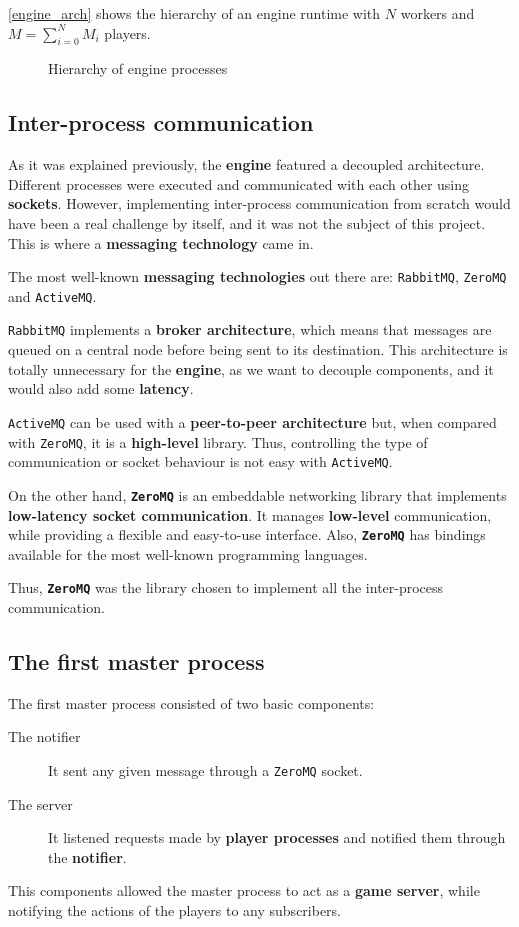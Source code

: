 \documentclass[a4paper,11pt,titlepage,abstract,numbers=noenddot,automark,mnsy,intlimits,rgb,dvipsnames]{report}
\begin{document}
\autoref{engine_arch} shows the hierarchy of an engine runtime with $N$ workers and $M = \sum_{i=0}^{N} M_i$ players.
\begin{figure}[H]
\begin{center}
\noindent\resizebox{\textwidth}{!}{

}
\end{center}
\caption{Hierarchy of engine processes}
\label{engine_arch}
\end{figure}
\subsection{Inter-process communication}
As it was explained previously, the \textbf{engine} featured a decoupled architecture. Different processes were
executed and communicated with each other using \textbf{sockets}. However, implementing inter-process communication from
scratch would have been a real challenge by itself, and it was not the subject of this project. This is where a
\textbf{messaging technology} came in.

The most well-known \textbf{messaging technologies} out there are: \texttt{RabbitMQ}, \texttt{ZeroMQ} and \texttt{ActiveMQ}.

\texttt{RabbitMQ} implements
a \textbf{broker architecture}, which means that messages are queued on a central node before being sent to its destination.
This architecture is totally unnecessary for the \textbf{engine}, as we want to decouple components, and it would also add
some \textbf{latency}.

\texttt{ActiveMQ} can be used with a \textbf{peer-to-peer architecture} but, when compared with \texttt{ZeroMQ}, it is a
\textbf{high-level} library. Thus, controlling the type of communication or socket behaviour is not easy with \texttt{ActiveMQ}.

On the other hand, \textbf{\texttt{ZeroMQ}} \cite{zeromq} is an embeddable networking library that implements
\textbf{low-latency socket communication}. It manages \textbf{low-level} communication, while providing a flexible and easy-to-use interface.
Also, \textbf{\texttt{ZeroMQ}} has bindings available for the most well-known programming languages.

Thus, \textbf{\texttt{ZeroMQ}} was the library chosen to implement all the inter-process communication.
\subsection{The first master process}
The first master process consisted of two basic components:
\begin{description}
\item[The notifier]
It sent any given message through a \texttt{ZeroMQ} socket.
\item[The server]
It listened requests made by \textbf{player processes} and notified them through the \textbf{notifier}.
\end{description}
This components allowed the master process to act as a \textbf{game server}, while notifying the actions of the players to any
subscribers.
\end{document}
